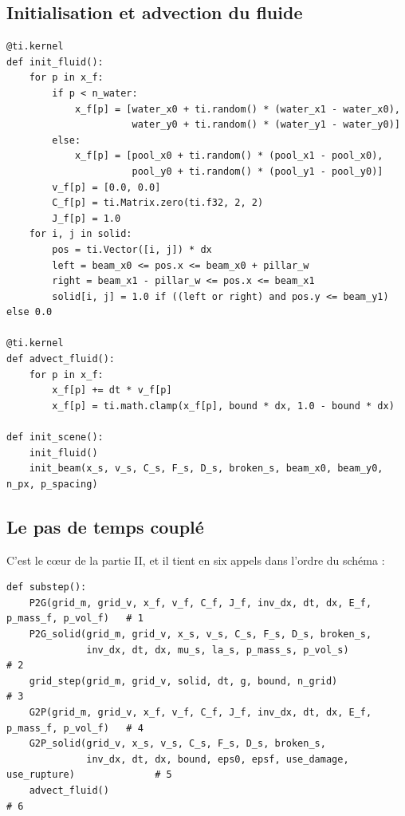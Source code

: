 \documentclass[11pt,a4paper]{article}
\begin{document}
\subsection{Initialisation et advection du fluide}

\begin{lstlisting}
@ti.kernel
def init_fluid():
    for p in x_f:
        if p < n_water:
            x_f[p] = [water_x0 + ti.random() * (water_x1 - water_x0),
                      water_y0 + ti.random() * (water_y1 - water_y0)]
        else:
            x_f[p] = [pool_x0 + ti.random() * (pool_x1 - pool_x0),
                      pool_y0 + ti.random() * (pool_y1 - pool_y0)]
        v_f[p] = [0.0, 0.0]
        C_f[p] = ti.Matrix.zero(ti.f32, 2, 2)
        J_f[p] = 1.0
    for i, j in solid:
        pos = ti.Vector([i, j]) * dx
        left = beam_x0 <= pos.x <= beam_x0 + pillar_w
        right = beam_x1 - pillar_w <= pos.x <= beam_x1
        solid[i, j] = 1.0 if ((left or right) and pos.y <= beam_y1) else 0.0

@ti.kernel
def advect_fluid():
    for p in x_f:
        x_f[p] += dt * v_f[p]
        x_f[p] = ti.math.clamp(x_f[p], bound * dx, 1.0 - bound * dx)

def init_scene():
    init_fluid()
    init_beam(x_s, v_s, C_s, F_s, D_s, broken_s, beam_x0, beam_y0, n_px, p_spacing)
\end{lstlisting}

\subsection{Le pas de temps couplé}

C'est le c\oe ur de la partie II, et il tient en six appels dans l'ordre du schéma :

\begin{lstlisting}
def substep():
    P2G(grid_m, grid_v, x_f, v_f, C_f, J_f, inv_dx, dt, dx, E_f, p_mass_f, p_vol_f)   # 1
    P2G_solid(grid_m, grid_v, x_s, v_s, C_s, F_s, D_s, broken_s,
              inv_dx, dt, dx, mu_s, la_s, p_mass_s, p_vol_s)                           # 2
    grid_step(grid_m, grid_v, solid, dt, g, bound, n_grid)                             # 3
    G2P(grid_m, grid_v, x_f, v_f, C_f, J_f, inv_dx, dt, dx, E_f, p_mass_f, p_vol_f)   # 4
    G2P_solid(grid_v, x_s, v_s, C_s, F_s, D_s, broken_s,
              inv_dx, dt, dx, bound, eps0, epsf, use_damage, use_rupture)              # 5
    advect_fluid()                                                                     # 6
\end{lstlisting}
\end{document}
